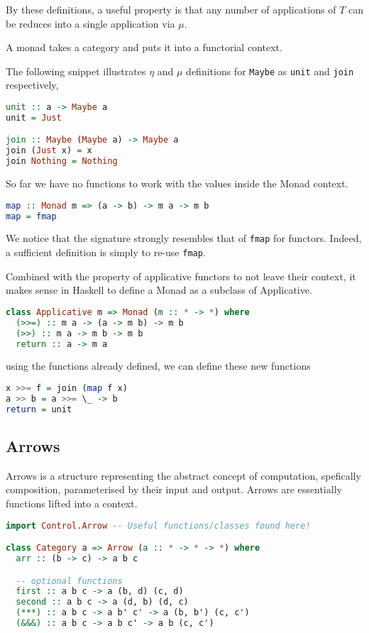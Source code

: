 By these definitions, a useful property is that any number of applications of $T$ can be reduces into a single application via $\mu$.

A monad takes a category and puts it into a functorial context.

The following snippet illustrates $\eta$ and $\mu$ definitions for \texttt{Maybe} as \texttt{unit} and \texttt{join} respectively,
\begin{lstlisting}[language=haskell]
unit :: a -> Maybe a
unit = Just

join :: Maybe (Maybe a) -> Maybe a
join (Just x) = x
join Nothing = Nothing
\end{lstlisting}

So far we have no functions to work with the values inside the Monad context.
\begin{lstlisting}[language=haskell]
map :: Monad m => (a -> b) -> m a -> m b
map = fmap
\end{lstlisting}
We notice that the signature strongly resembles that of \texttt{fmap} for functors. Indeed, a sufficient definition is simply to re-use \texttt{fmap}.

Combined with the property of applicative functors to not leave their context, it makes sense in Haskell to define a Monad as a subclass of Applicative.
\begin{lstlisting}[language=haskell]
class Applicative m => Monad (m :: * -> *) where
  (>>=) :: m a -> (a -> m b) -> m b
  (>>) :: m a -> m b -> m b
  return :: a -> m a
\end{lstlisting}
using the functions already defined, we can define these new functions
\begin{lstlisting}[language=haskell]
x >>= f = join (map f x)
a >> b = a >>= \_ -> b
return = unit
\end{lstlisting}

\subsection{Arrows}
Arrows is a structure representing the abstract concept of computation, spefically composition, parameterised by their input and output. Arrows are essentially functions lifted into a context.

\begin{lstlisting}[language=haskell]
import Control.Arrow -- Useful functions/classes found here!

class Category a => Arrow (a :: * -> * -> *) where
  arr :: (b -> c) -> a b c

  -- optional functions
  first :: a b c -> a (b, d) (c, d)
  second :: a b c -> a (d, b) (d, c)
  (***) :: a b c -> a b' c' -> a (b, b') (c, c')
  (&&&) :: a b c -> a b c' -> a b (c, c')
\end{lstlisting}

